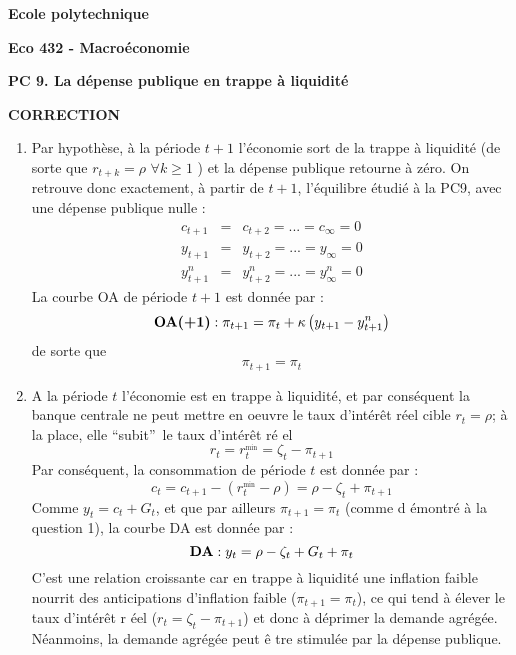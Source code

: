 \documentclass[11pt,a4paper]{article}
\begin{document}
\begin{center}
\textbf{Ecole polytechnique}

\bigskip

\textbf{Eco 432 - Macro\'{e}conomie}

\bigskip

\textbf{PC 9. La d\'{e}pense publique en trappe \`{a} liquidit\'{e}}

\bigskip

\textbf{CORRECTION}
\end{center}

\bigskip

\begin{enumerate}
\item Par hypoth\`{e}se, \`{a} la p\'{e}riode $t+1$ l'\'{e}conomie sort de
la trappe \`{a} liquidit\'{e} (de sorte que $r_{t+k}=\rho $ $\forall k\geq 1$%
) et la d\'{e}pense publique retourne \`{a} z\'{e}ro. On retrouve donc
exactement, \`{a} partir de $t+1$, l'\'{e}quilibre \'{e}tudi\'{e} \`{a} la
PC9, avec une d\'{e}pense publique nulle :%
\begin{eqnarray*}
c_{t+1} &=&c_{t+2}=...=c_{\infty }=0 \\
y_{t+1} &=&y_{t+2}=...=y_{\infty }=0 \\
y_{t+1}^{n} &=&y_{t+2}^{n}=...=y_{\infty }^{n}=0
\end{eqnarray*}%
La courbe OA de p\'{e}riode $t+1$ est donn\'{e}e par :%
\begin{equation*}
\text{\textbf{OA(+1)}}:\pi _{t+1}=\pi _{t}+\kappa \left(
y_{t+1}-y_{t+1}^{n}\right)
\end{equation*}%
de sorte que%
\begin{equation*}
\pi _{t+1}=\pi _{t}
\end{equation*}

\item A la p\'{e}riode $t$ l'\'{e}conomie est en trappe \`{a} liquidit\'{e},
et par cons\'{e}quent la banque centrale ne peut mettre en oeuvre le taux
d'int\'{e}r\^{e}t r\'{e}el cible $r_{t}=\rho $; \`{a} la place, elle
\textquotedblleft subit\textquotedblright\ le taux d'int\'{e}r\^{e}t r\'{e}%
el 
\begin{equation*}
r_{t}=r_{t}^{_{\min }}=\zeta _{t}-\pi _{t+1}
\end{equation*}%
Par cons\'{e}quent, la consommation de p\'{e}riode $t$ est donn\'{e}e par :%
\begin{equation*}
c_{t}=c_{t+1}-\left( r_{t}^{_{\min }}-\rho \right) =\rho -\zeta _{t}+\pi
_{t+1}
\end{equation*}%
Comme $y_{t}=c_{t}+G_{t}$, et que par ailleurs $\pi _{t+1}=\pi _{t}$ (comme d%
\'{e}montr\'{e} \`{a} la question 1), la courbe DA est donn\'{e}e par :%
\begin{equation*}
\text{\textbf{DA}}:y_{t}=\rho -\zeta _{t}+G_{t}+\pi _{t}
\end{equation*}%
C'est une relation croissante car en trappe \`{a} liquidit\'{e} une
inflation faible nourrit des anticipations d'inflation faible ($\pi
_{t+1}=\pi _{t}$), ce qui tend \`{a} \'{e}lever le taux d'int\'{e}r\^{e}t r%
\'{e}el ($r_{t}=\zeta _{t}-\pi _{t+1}$) et donc \`{a} d\'{e}primer la
demande agr\'{e}g\'{e}e. N\'{e}anmoins, la demande agr\'{e}g\'{e}e peut \^{e}%
tre stimul\'{e}e par la d\'{e}pense publique.


\end{enumerate}
\end{document}
